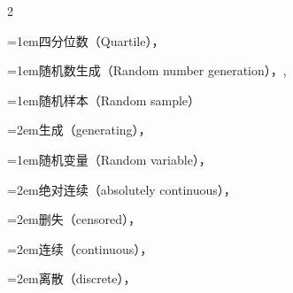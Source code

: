 \begin{multicols}{2}
\par\noindent\hangindent=1em\hspace*{0em}\label{idx:860}四分位数（Quartile），\hyperref[idxocc:860:216]{\pageref*{idxocc:860:216}}\par
\par\addvspace{2pt}
\par\noindent\hangindent=1em\hspace*{0em}\label{idx:861}随机数生成（Random number generation），\hyperref[idxocc:861:76]{\pageref*{idxocc:861:76}}, \hyperref[exercise:5.50]{\pageref*{exercise:5.50}}\par
\par\addvspace{2pt}
\par\noindent\hangindent=1em\hspace*{0em}\label{idx:862}随机样本（Random sample）\par
\par\noindent\hangindent=2em\hspace*{1em}\label{idx:863}生成（generating），\hyperref[sec:5.6]{\pageref*{sec:5.6}}\par
\par\addvspace{2pt}
\par\noindent\hangindent=1em\hspace*{0em}\label{idx:864}随机变量（Random variable），\hyperref[def:1.4.1]{\pageref*{def:1.4.1}}\par
\par\noindent\hangindent=2em\hspace*{1em}\label{idx:865}绝对连续（absolutely continuous），\hyperref[idxocc:865:62]{\pageref*{idxocc:865:62}}\par
\par\noindent\hangindent=2em\hspace*{1em}\label{idx:866}删失（censored），\hyperref[exercise:4.26]{\pageref*{exercise:4.26}}\par
\par\noindent\hangindent=2em\hspace*{1em}\label{idx:867}连续（continuous），\hyperref[def:1.5.7]{\pageref*{def:1.5.7}}\par
\par\noindent\hangindent=2em\hspace*{1em}\label{idx:868}离散（discrete），\hyperref[def:1.5.7]{\pageref*{def:1.5.7}}\par

\end{multicols}
